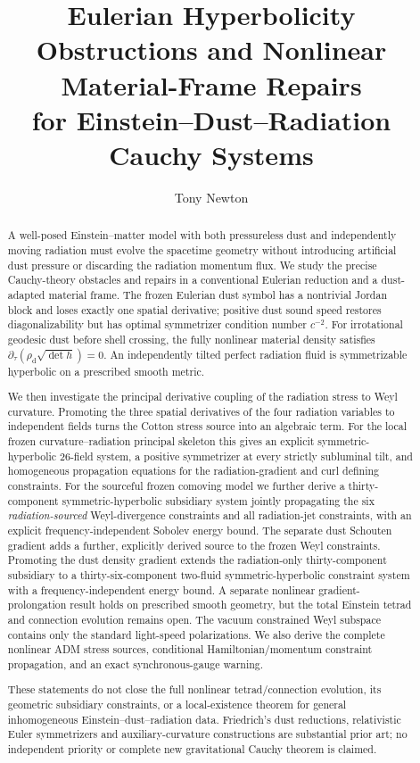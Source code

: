 \documentclass[11pt,a4paper]{article}
\title{\textbf{Eulerian Hyperbolicity Obstructions and Nonlinear Material-Frame Repairs}\\for Einstein--Dust--Radiation Cauchy Systems}
\author{Tony Newton}
\date{}
\begin{document}
\maketitle
\begin{abstract}
A well-posed Einstein--matter model with both pressureless dust and
independently moving radiation must evolve the spacetime geometry
without introducing artificial dust pressure or discarding the
radiation momentum flux. We study the precise Cauchy-theory
obstacles and repairs in a conventional Eulerian reduction and
a dust-adapted material frame. The frozen Eulerian dust symbol
has a nontrivial Jordan block and loses exactly one spatial
derivative; positive dust sound speed restores diagonalizability
but has optimal symmetrizer condition number $c^{-2}$.
For irrotational geodesic dust before shell crossing, the fully
nonlinear material density satisfies
$\partial_\tau(\rho_{\mathrm d}\sqrt{\det h})=0$.
An independently tilted perfect radiation fluid is
symmetrizable hyperbolic on a prescribed smooth metric.

We then investigate the principal derivative coupling of
the radiation stress to Weyl curvature. Promoting the
three spatial derivatives of the four radiation variables
to independent fields turns the Cotton stress source
into an algebraic term. For the local frozen
curvature--radiation principal skeleton this gives an
explicit symmetric-hyperbolic $26$-field system,
a positive symmetrizer at every strictly subluminal
tilt, and homogeneous propagation equations for the
radiation-gradient and curl defining constraints.
For the sourceful frozen comoving model we further
derive a thirty-component symmetric-hyperbolic
subsidiary system jointly propagating the six
\emph{radiation-sourced} Weyl-divergence constraints and
all radiation-jet constraints, with an explicit
frequency-independent Sobolev energy bound.
The separate dust Schouten gradient
adds a further, explicitly derived source
to the frozen Weyl constraints.
Promoting the dust density gradient
extends the radiation-only
thirty-component subsidiary
to a thirty-six-component
two-fluid symmetric-hyperbolic
constraint system with a
frequency-independent energy bound.
A separate nonlinear
gradient-prolongation result
holds on prescribed smooth
geometry, but the total
Einstein tetrad and connection
evolution remains open. The vacuum constrained Weyl
subspace contains only the standard light-speed
polarizations.
We also derive the complete nonlinear ADM stress sources,
conditional Hamiltonian/momentum constraint propagation,
and an exact synchronous-gauge warning.

These statements do not close the full nonlinear
tetrad/connection evolution, its geometric subsidiary
constraints, or a local-existence theorem for general
inhomogeneous Einstein--dust--radiation data.
Friedrich's dust reductions, relativistic Euler
symmetrizers and auxiliary-curvature constructions
are substantial prior art; no independent priority
or complete new gravitational Cauchy theorem is claimed.
\end{abstract}
\end{document}
